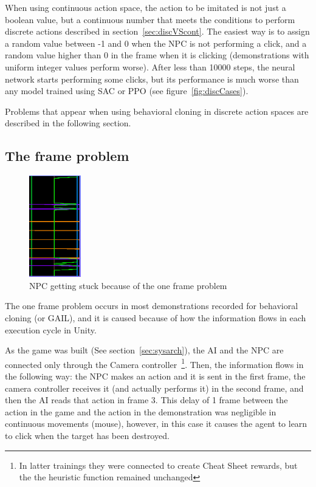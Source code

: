 When using continuous action space, the action to be imitated is not just a boolean value, but a continuous number that meets the conditions to perform discrete actions described in section~\ref{sec:discVScont}. The easiest way is to assign a random value between -1 and 0 when the NPC is not performing a click, and a random value higher than 0 in the frame when it is clicking (demonstrations with uniform integer values perform worse). After less than 10000 steps, the neural network starts performing some clicks, but its performance is much worse than any model trained using SAC or PPO (see figure~\ref{fig:discCases}).

Problems that appear when using behavioral cloning in discrete action spaces are described in the following section.


\subsection{The frame problem}

\begin{figure}
    \centering
    \includegraphics[width=0.2\textwidth]{img/bcStuck.png}
		\caption{NPC getting stuck because of the one frame problem}
		\label{fig:bcStuck}
\end{figure}

The one frame problem occurs in most demonstrations recorded for behavioral cloning (or GAIL), and it is caused because of how the information flows in each execution cycle in Unity.

As the game was built (See section~\ref{sec:sysarch}), the AI and the NPC are connected only through the Camera controller~\footnote{In latter trainings they were connected to create Cheat Sheet rewards, but the the heuristic function remained unchanged}. Then, the information flows in the following way: the NPC makes an action and it is sent in the first frame, the camera controller receives it (and actually performs it) in the second frame, and then the AI reads that action in frame 3. This delay of 1 frame between the action in the game and the action in the demonstration was negligible in continuous movements (mouse), however, in this case it causes the agent to learn to click when the target has been destroyed.

